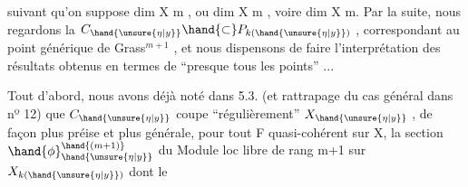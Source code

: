 
suivant qu'on suppose  dim X \hand{$\geqslant$} m , ou  dim X \hand{$\leqslant$} m , voire dim X \hand{$<$} m.
Par la suite, nous regardons la $C_{\hand{\unsure{\eta|y}}}\hand{\subset} P_{k(\hand{\unsure{\eta|y}})}$ , correspondant au point
générique  de  Grass$^{m+1}$ , et nous dispensons  de faire l'interprétation
des résultats obtenus en termes de  ``presque tous les points'' ...

Tout d'abord, nous avons déjà noté dans 5.3. (et rattrapage du
cas général dans nº 12)  que $C_{\hand{\unsure{\eta|y}}}$  coupe ``régulièrement'' $X_{\hand{\unsure{\eta|y}}}$ , de façon
plus préise et plus générale, pour tout F quasi-cohérent sur X,
la section $\hand{\phi}_{\hand{\unsure{\eta|y}}}^{\hand{(m+1)}}$ du Module loc libre de rang  m+1  sur  $X_{k(\hand{\unsure{\eta|y}})}$  dont le
